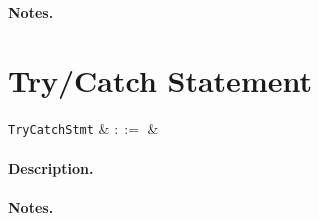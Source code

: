 \paragraph{Notes.} 


\section{Try/Catch Statement}

\begin{syntax}
  \verb+TryCatchStmt+ & $::=$ &\\
\end{syntax}

\paragraph{Description.}

\noindent

\paragraph{Notes.} 
